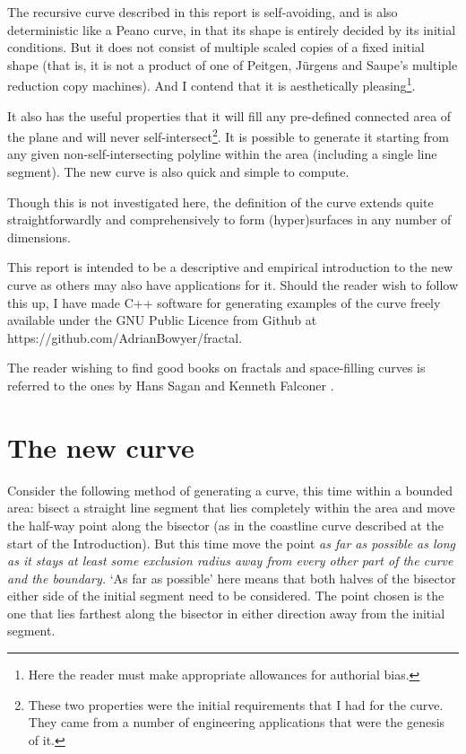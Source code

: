 \documentclass[12pt]{article}
\begin{document}
The recursive curve described in this report is self-avoiding, and is
also deterministic like a Peano curve, in that its shape is entirely
decided by its initial conditions.  But it does not consist of
multiple scaled copies of a fixed initial shape (that is, it is not a
product of one of Peitgen, J\"{u}rgens and Saupe's multiple
reduction copy machines).  And I contend that it is aesthetically
pleasing\footnote{Here the reader must make appropriate allowances for
authorial bias.}.

It also has the useful properties that it will fill any pre-defined
connected area of the plane and will never
self-intersect\footnote{These two properties were the initial
requirements that I had for the curve.  They came from a number of
engineering applications that were the genesis of it.}.  It is
possible to generate it starting from any given non-self-intersecting
polyline within the area (including a single line
segment).  The new curve is also quick and simple to compute.

Though this is not investigated here, the definition of the curve
extends quite straightforwardly and comprehensively to form
(hyper)surfaces in any number of dimensions.

This report is intended to be a descriptive and empirical introduction
to the new curve as others may also have applications for it.  Should
the reader wish to follow this up, I have made C++ software for
generating examples of the curve freely available under the GNU Public
Licence \cite{gpl} from Github at
https://github.com/AdrianBowyer/fractal.  

The reader wishing to find good books on fractals and space-filling
curves is referred to the ones by Hans Sagan \cite{sagan} and Kenneth
Falconer \cite{falconer}.

\section*{The new curve}

Consider the following method of generating a curve, this time within
a bounded area: bisect a straight line segment that lies completely
within the area and move the half-way point along the bisector (as in
the coastline curve described at the start of the Introduction).  But
this time move the point {\em as far as possible as long as it stays
at least some exclusion radius away from every other part of the curve
and the boundary.}  `As far as possible' here means that both halves
of the bisector either side of the initial segment need to be
considered.  The point chosen is the one that lies farthest along the
bisector in either direction away from the initial segment.
\end{document}
